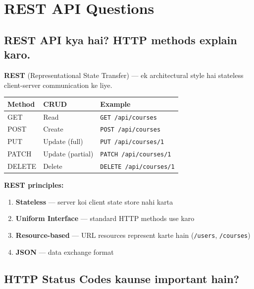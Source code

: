 \documentclass[12pt,a4paper]{article}
\begin{document}
\section{REST API Questions}

\setcounter{subsection}{70}

\subsection{REST API kya hai? HTTP methods explain karo.}

\begin{answerbox}
\textbf{REST} (Representational State Transfer) --- ek architectural style hai stateless client-server communication ke liye.
\begin{center}
\begin{tabular}{>{\ttfamily}l l l}
\toprule
\textbf{Method} & \textbf{CRUD} & \textbf{Example} \\
\midrule
GET & Read & \texttt{GET /api/courses} \\
POST & Create & \texttt{POST /api/courses} \\
PUT & Update (full) & \texttt{PUT /api/courses/1} \\
PATCH & Update (partial) & \texttt{PATCH /api/courses/1} \\
DELETE & Delete & \texttt{DELETE /api/courses/1} \\
\bottomrule
\end{tabular}
\end{center}
\textbf{REST principles:}
\begin{enumerate}
    \item \textbf{Stateless} --- server koi client state store nahi karta
    \item \textbf{Uniform Interface} --- standard HTTP methods use karo
    \item \textbf{Resource-based} --- URL resources represent karte hain (\texttt{/users}, \texttt{/courses})
    \item \textbf{JSON} --- data exchange format
\end{enumerate}
\end{answerbox}

\subsection{HTTP Status Codes kaunse important hain?}
\end{document}
